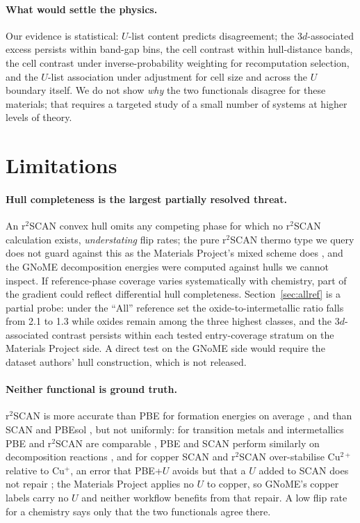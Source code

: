 \documentclass[11pt]{article}
\begin{document}
\paragraph{What would settle the physics.} Our evidence is statistical: $U$-list
content predicts disagreement; the 3$d$-associated excess persists within band-gap
bins, the cell contrast within hull-distance bands, the cell contrast under inverse-probability weighting for recomputation selection,
and the $U$-list association under adjustment for cell size and across the $U$ boundary
itself. We do not show \emph{why} the two functionals
disagree for these materials; that requires a targeted study of a small number of
systems at higher levels of theory.

\section{Limitations}\label{sec:limits}

\paragraph{Hull completeness is the largest partially resolved threat.} An r$^2$SCAN
convex hull omits any competing phase for which no r$^2$SCAN calculation exists,
\emph{understating} flip rates; the pure r$^2$SCAN thermo type we query does not guard
against this as the Materials Project's mixed scheme does \citep{mpmixingdocs}, and the
GNoME decomposition energies were computed against hulls we cannot inspect. If
reference-phase coverage varies systematically with chemistry, part of the gradient
could reflect differential hull completeness. Section~\ref{sec:allref} is a partial
probe: under the ``All'' reference set the oxide-to-intermetallic ratio falls from 2.1
to 1.3 while oxides remain among the three highest classes, and the 3$d$-associated contrast
persists within each tested entry-coverage stratum on the Materials Project side. A
direct test on the GNoME side would require the dataset authors' hull construction,
which is not released.

\paragraph{Neither functional is ground truth.} r$^2$SCAN is more accurate than PBE for
formation energies on average \citep{kothakonda2023}, and than SCAN and PBEsol
\citep{kingsbury2022prm}, but not uniformly: for transition metals and intermetallics
PBE and r$^2$SCAN are comparable \citep{kothakonda2023}, PBE and SCAN perform similarly
on decomposition reactions \citep{bartel2019}, and for copper SCAN and r$^2$SCAN
over-stabilise Cu$^{2+}$ relative to Cu$^{+}$, an error that PBE+$U$ avoids but that a $U$
added to SCAN does not repair \citep{bae2025}; the Materials Project applies no $U$ to
copper, so GNoME's copper labels carry no $U$ and neither workflow benefits from that repair. A low flip rate for a chemistry says only that
the two functionals agree there.
\end{document}
